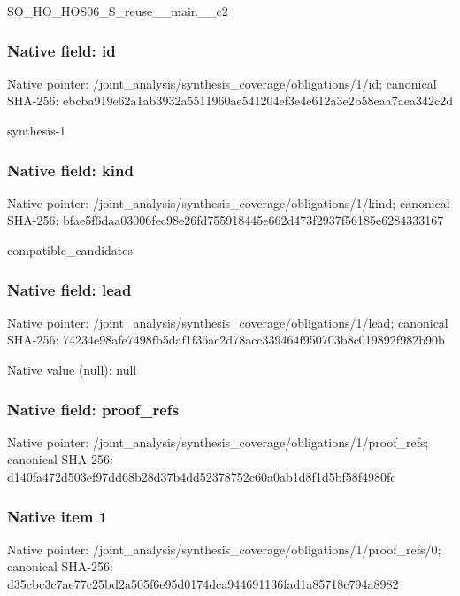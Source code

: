 \documentclass[10pt,a4paper]{article}
\begin{document}
\begingroup\raggedright\sloppy SO\_\allowbreak{}HO\_\allowbreak{}HOS06\_\allowbreak{}S\_\allowbreak{}reuse\_\allowbreak{}\_\allowbreak{}main\_\allowbreak{}\_\allowbreak{}c2\par\endgroup

\subsubsection{Native field: id}
Native pointer: /joint\_\allowbreak{}analysis/synthesis\_\allowbreak{}coverage/obligations/1/id; canonical SHA-256: ebcba919e62a1ab3932a5511960ae541204ef3e4e612a3e2b58eaa7aea342c2d

\begingroup\raggedright\sloppy synthesis-1\par\endgroup

\subsubsection{Native field: kind}
Native pointer: /joint\_\allowbreak{}analysis/synthesis\_\allowbreak{}coverage/obligations/1/kind; canonical SHA-256: bfae5f6daa03006fec98e26fd755918445e662d473f2937f56185e6284333167

\begingroup\raggedright\sloppy compatible\_\allowbreak{}candidates\par\endgroup

\subsubsection{Native field: lead}
Native pointer: /joint\_\allowbreak{}analysis/synthesis\_\allowbreak{}coverage/obligations/1/lead; canonical SHA-256: 74234e98afe7498fb5daf1f36ac2d78acc339464f950703b8c019892f982b90b

Native value (null): null

\subsubsection{Native field: proof\_\allowbreak{}refs}
Native pointer: /joint\_\allowbreak{}analysis/synthesis\_\allowbreak{}coverage/obligations/1/proof\_\allowbreak{}refs; canonical SHA-256: d140fa472d503ef97dd68b28d37b4dd52378752c60a0ab1d8f1d5bf58f4980fc

\subsubsection{Native item 1}
Native pointer: /joint\_\allowbreak{}analysis/synthesis\_\allowbreak{}coverage/obligations/1/proof\_\allowbreak{}refs/0; canonical SHA-256: d35cbc3c7ae77c25bd2a505f6e95d0174dca944691136fad1a85718c794a8982
\end{document}
